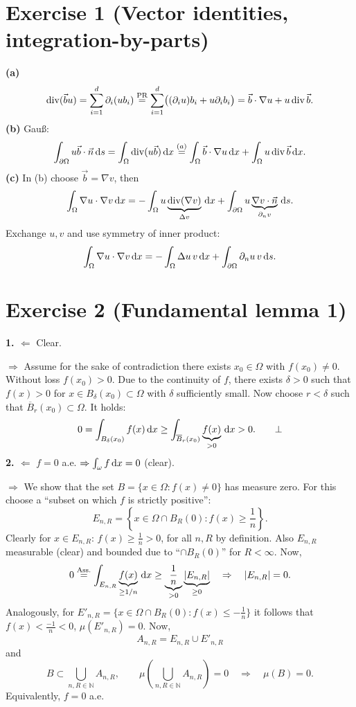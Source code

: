 ﻿\documentclass[11pt,a4paper]{article}
\begin{document}
\begingroup
\setlength{\parskip}{0pt}
\submissionheader
\endgroup
\enlargethispage{\baselineskip}

\section*{Exercise 1 (Vector identities, integration-by-parts)}
\textbf{(a)}
\[
\operatorname{div}(\vec b u)=\sum_{i=1}^d\partial_i(ub_i)
\overset{\mathrm{PR}}{=}\sum_{i=1}^d\bigl((\partial_i u)b_i+u\partial_i b_i\bigr)
=\vec b\cdot\nabla u+u\operatorname{div}\vec b.
\]
\textbf{(b)} Gau\ss:
\[
\int_{\partial\Omega}u\vec b\cdot\vec n\,\mathrm{d}s
=\int_\Omega\operatorname{div}(u\vec b)\,\mathrm{d}x
\overset{(a)}{=}\int_\Omega\vec b\cdot\nabla u\,\mathrm{d}x+\int_\Omega u\operatorname{div}\vec b\,\mathrm{d}x.
\]
\textbf{(c)} In (b) choose $\vec b=\nabla v$, then
\[
\int_\Omega\nabla u\cdot\nabla v\,\mathrm{d}x
=-\int_\Omega u\underbrace{\operatorname{div}(\nabla v)}_{\Delta v}\,\mathrm{d}x
+\int_{\partial\Omega}u\underbrace{\nabla v\cdot\vec n}_{\partial_n v}\,\mathrm{d}s.
\]
Exchange $u,v$ and use symmetry of inner product:
\[
\int_\Omega\nabla u\cdot\nabla v\,\mathrm{d}x
=-\int_\Omega\Delta u\,v\,\mathrm{d}x+\int_{\partial\Omega}\partial_n u\,v\,\mathrm{d}s.
\]

\section*{Exercise 2 (Fundamental lemma 1)}
\textbf{1. $\Leftarrow$} Clear.

\textbf{$\Rightarrow$} Assume for the sake of contradiction there exists
$x_0\in\Omega$ with $f(x_0)\ne0$. Without loss $f(x_0)>0$.
Due to the continuity of $f$, there exists $\delta>0$ such that $f(x)>0$
for $x\in B_\delta(x_0)\subset\Omega$ with $\delta$ sufficiently small.
Now choose $r<\delta$ such that
$\overline B_r(x_0)\subset\Omega$. It holds:
\[
0=\int_{B_\delta(x_0)}f(x)\,\mathrm{d}x
\ge\int_{\overline B_r(x_0)}\underbrace{f(x)}_{>0}\,\mathrm{d}x>0.\qquad\bot
\]
\textbf{2. $\Leftarrow$}
$f=0$ a.e. $\Rightarrow\int_\omega f\,\mathrm{d}x=0$ (clear).

\textbf{$\Rightarrow$} We show that the set $B=\{x\in\Omega:f(x)\ne0\}$ has measure zero.
For this choose a ``subset on which $f$ is strictly positive'':
\[
E_{n,R}=\left\{x\in\Omega\cap B_R(0):f(x)\ge\frac1n\right\}.
\]
Clearly for $x\in E_{n,R}$: $f(x)\ge\frac1n>0$, for all $n,R$ by definition.
Also $E_{n,R}$ measurable (clear) and bounded due to
``$\cap B_R(0)$'' for $R<\infty$. Now,
\[
0\overset{\mathrm{Ass.}}{=}\int_{E_{n,R}}\underbrace{f(x)}_{\ge1/n}\,\mathrm{d}x
\ge\underbrace{\frac1n}_{>0}\underbrace{|E_{n,R}|}_{\ge0}
\quad\Rightarrow\quad |E_{n,R}|=0.
\]
Analogously, for
$E'_{n,R}=\{x\in\Omega\cap B_R(0):f(x)\le-\frac1n\}$
it follows that $f(x)<\frac{-1}{n}<0$, $\mu(E'_{n,R})=0$. Now,
\[
A_{n,R}=E_{n,R}\cup E'_{n,R}
\]
and
\[
B\subset\bigcup_{n,R\in\mathbb N}A_{n,R},\qquad
\mu\left(\bigcup_{n,R\in\mathbb N}A_{n,R}\right)=0
\quad\Rightarrow\quad\mu(B)=0.
\]
Equivalently, $f=0$ a.e.
\end{document}
